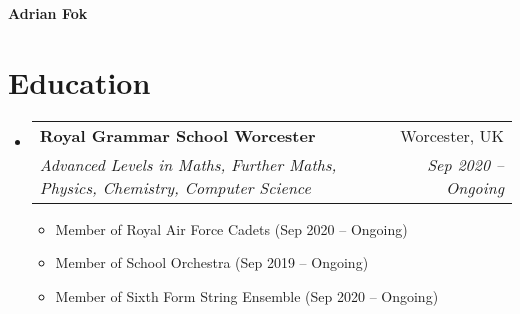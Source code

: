 \documentclass[letterpaper,11pt]{article}
\makeatletter
\newcommand{\resumeItemSmall}[2]{

  \item\small{
    {\indent #1 (#2)}
  }
}
\newcommand{\resumeSubheading}[4]{
  \vspace{-1pt}\item
    \begin{tabular*}{0.97\textwidth}{l@{\extracolsep{\fill}}r}
      \textbf{#1} & #2 \\
      \textit{\small#3} & \textit{\small #4} \\
    \end{tabular*}\vspace{-5pt}
}
\newcommand{\resumeSubHeadingListStart}{\begin{itemize}[leftmargin=*,label={}]}
\newcommand{\resumeSubHeadingListEnd}{\end{itemize}}
\newcommand{\resumeItemListStart}{\begin{itemize}[label={}]}
\newcommand{\resumeItemListEnd}{\end{itemize}\vspace{-5pt}}
\makeatother
\begin{document}

\textbf{\Large Adrian Fok}
	

\section{Education}
  \resumeSubHeadingListStart
    \resumeSubheading
      {Royal Grammar School Worcester}{Worcester, UK}
      {Advanced Levels in Maths, Further Maths, Physics, Chemistry, Computer Science}{Sep 2020 -- Ongoing}
	  \resumeItemListStart
        \resumeItemSmall{Member of Royal Air Force Cadets}{Sep 2020 -- Ongoing}
        \resumeItemSmall{Member of School Orchestra}{Sep 2019 -- Ongoing}
		\resumeItemSmall{Member of Sixth Form String Ensemble}{Sep 2020 -- Ongoing}
      \resumeItemListEnd
  \resumeSubHeadingListEnd
 
\end{document}
